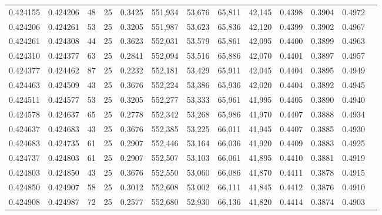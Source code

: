 \begin{tabular}{rrrrrrrrrrrrr}
0.424155 & 0.424206 &    48 &  25 &                                     0.3425 & 551,934 &  53,676 &  65,811 &  42,145 & 0.4398 & 0.3904 & 0.4972 \\
0.424206 & 0.424261 &    53 &  25 &                                     0.3205 & 551,987 &  53,623 &  65,836 &  42,120 & 0.4399 & 0.3902 & 0.4967 \\
0.424261 & 0.424308 &    44 &  25 &                                     0.3623 & 552,031 &  53,579 &  65,861 &  42,095 & 0.4400 & 0.3899 & 0.4963 \\
0.424310 & 0.424377 &    63 &  25 &                                     0.2841 & 552,094 &  53,516 &  65,886 &  42,070 & 0.4401 & 0.3897 & 0.4957 \\
0.424377 & 0.424462 &    87 &  25 &                                     0.2232 & 552,181 &  53,429 &  65,911 &  42,045 & 0.4404 & 0.3895 & 0.4949 \\
0.424463 & 0.424509 &    43 &  25 &                                     0.3676 & 552,224 &  53,386 &  65,936 &  42,020 & 0.4404 & 0.3892 & 0.4945 \\
0.424511 & 0.424577 &    53 &  25 &                                     0.3205 & 552,277 &  53,333 &  65,961 &  41,995 & 0.4405 & 0.3890 & 0.4940 \\
0.424578 & 0.424637 &    65 &  25 &                                     0.2778 & 552,342 &  53,268 &  65,986 &  41,970 & 0.4407 & 0.3888 & 0.4934 \\
0.424637 & 0.424683 &    43 &  25 &                                     0.3676 & 552,385 &  53,225 &  66,011 &  41,945 & 0.4407 & 0.3885 & 0.4930 \\
0.424683 & 0.424735 &    61 &  25 &                                     0.2907 & 552,446 &  53,164 &  66,036 &  41,920 & 0.4409 & 0.3883 & 0.4925 \\
0.424737 & 0.424803 &    61 &  25 &                                     0.2907 & 552,507 &  53,103 &  66,061 &  41,895 & 0.4410 & 0.3881 & 0.4919 \\
0.424803 & 0.424850 &    43 &  25 &                                     0.3676 & 552,550 &  53,060 &  66,086 &  41,870 & 0.4411 & 0.3878 & 0.4915 \\
0.424850 & 0.424907 &    58 &  25 &                                     0.3012 & 552,608 &  53,002 &  66,111 &  41,845 & 0.4412 & 0.3876 & 0.4910 \\
0.424908 & 0.424987 &    72 &  25 &                                     0.2577 & 552,680 &  52,930 &  66,136 &  41,820 & 0.4414 & 0.3874 & 0.4903 \\

\end{tabular}

